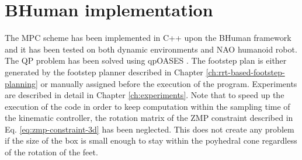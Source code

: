 \section{BHuman implementation}
The MPC scheme has been implemented in C++ upon the BHuman framework
\cite{BHumanCodeRelease2018} and it has been tested on both dynamic environments 
and NAO humanoid robot. The QP problem has been solved using qpOASES
\cite{qpOASES}. The footstep plan is either generated by the footstep planner 
described in Chapter \ref{ch:rrt-based-footstep-planning} or manually assigned 
before the execution of the program. Experiments are described in detail in 
Chapter \ref{ch:experiments}. Note that to speed up the execution of the code 
in order to keep computation within the sampling time of the kinematic 
controller, the rotation matrix of the ZMP constraint described in Eq.
\eqref{eq:zmp-constraint-3d} has been neglected. This does not create any
problem if the size of the box is small enough to stay within the poyhedral 
cone regardless of the rotation of the feet.

